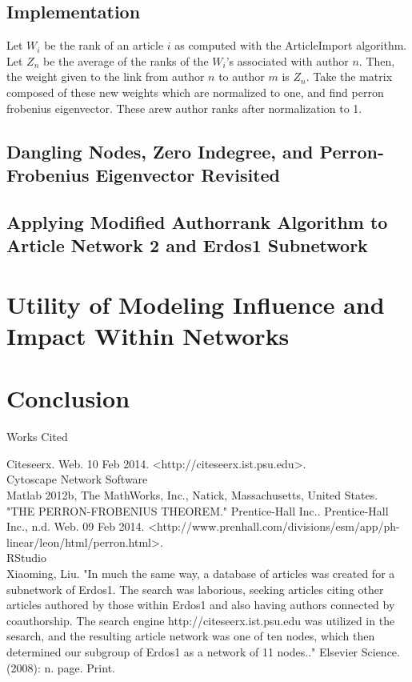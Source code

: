 \documentclass[12pt]{article} %
\begin{document}
\subsection{Implementation} 

Let $W_{i}$ be the rank of an article $i$ as computed with the ArticleImport algorithm. Let $Z_n$ be the average of the ranks of the $W_{i}$'s associated with author $n$. Then, the weight given to the link from author $n$ to author $m$ is $Z_n$. Take the matrix composed of these new weights which are normalized to one, and find perron frobenius eigenvector. These arew author ranks after normalization to 1.
\subsection{Dangling Nodes, Zero Indegree, and Perron-Frobenius Eigenvector Revisited}
\subsection{Applying Modified Authorrank Algorithm to Article Network 2 and Erdos1 Subnetwork}%
\section{Utility of Modeling Influence and Impact Within Networks}
\section{Conclusion}
\begin{center}
 Works Cited



Citeseerx. Web. 10 Feb 2014. <http://citeseerx.ist.psu.edu>.\\
Cytoscape Network Software\\

Matlab 2012b, The MathWorks, Inc., Natick, Massachusetts, United States.\\

"THE PERRON-FROBENIUS THEOREM." Prentice-Hall Inc.. Prentice-Hall Inc., n.d. Web. 09 Feb 2014. <http://www.prenhall.com/divisions/esm/app/ph-linear/leon/html/perron.html>.\\
RStudio\\

Xiaoming, Liu. "In much the same way, a database of articles was created for a subnetwork of Erdos1. The search was laborious, seeking articles citing other articles authored by those within Erdos1 and also having authors connected by coauthorship. The search engine http://citeseerx.ist.psu.edu was utilized in the sesarch, and the resulting article network was one of ten nodes, which then determined our subgroup of Erdos1 as a network of 11 nodes.." Elsevier Science. (2008): n. page. Print.

\end{center}
\end{document}
